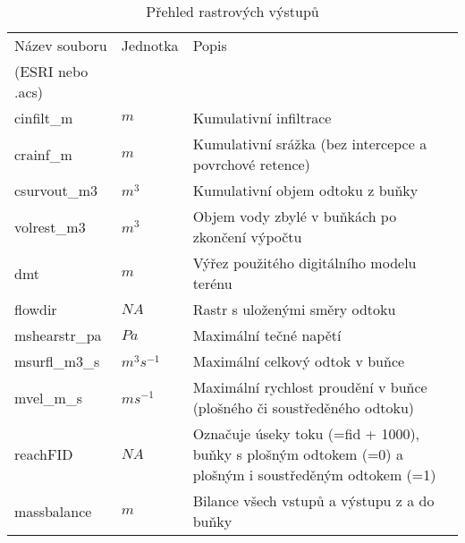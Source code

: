 

\begin{table}[t]
 

 \centering
 \caption{Přehled rastrových výstupů}
\label{tab:vystupyrast}

 \begin{tabular}{llp{}}
 \hline
  Název souboru    & Jednotka    & Popis       \\ 
  (ESRI nebo .acs)    &     &        \\ \hline \hline
  cinfilt\_m      &   $m$        & Kumulativní infiltrace \\
  crainf\_m          &  $m$    &  Kumulativní srážka (bez intercepce a povrchové retence) \\
  csurvout\_m3       &  $m^3$  & Kumulativní objem odtoku z buňky \\
  volrest\_m3          &  $m^3$  & Objem vody zbylé v buňkách po zkončení výpočtu\\
  dmt                 &  $m$ &  Výřez použitého digitálního modelu terénu \\
  flowdir             &  $NA$ &  Rastr s uloženými směry odtoku  \\
  mshearstr\_pa      & $Pa$ &  Maximální tečné napětí \\
  msurfl\_m3\_s   &   $m^3s^{-1}$ &  Maximální celkový odtok v buňce\\
  mvel\_m\_s       &   $ms^{-1}$ &  Maximální rychlost proudění v buňce (plošného či soustředěného odtoku) \\
  reachFID            &  $NA$  &  Označuje úseky toku (=fid + 1000), buňky s plošným odtokem (=0) a plošným i soustředěným odtokem (=1) \\
  massbalance         &   $m$  &  Bilance všech vstupů a výstupu z a do buňky  \\
  \hline

\end{tabular}
\end{table}
